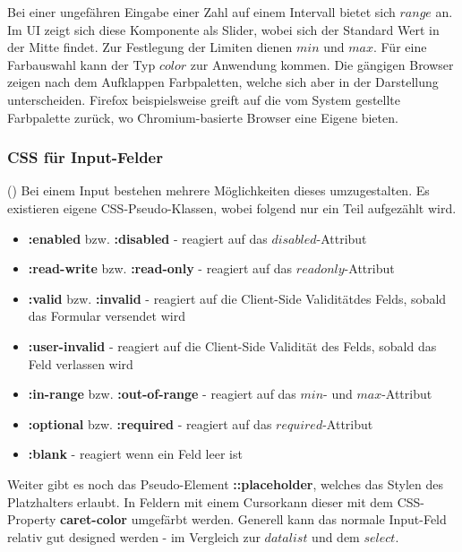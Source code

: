 Bei einer ungefähren Eingabe einer Zahl auf einem Intervall bietet sich $range$ an.
Im UI zeigt sich diese Komponente als Slider, wobei sich der Standard Wert in der Mitte findet.
Zur Festlegung der Limiten dienen $min$ und $max$.
Für eine Farbauswahl kann der Typ $color$ zur Anwendung kommen. 
Die gängigen Browser zeigen nach dem Aufklappen Farbpaletten, welche sich aber in der Darstellung unterscheiden. 
Firefox beispielsweise greift auf die vom System gestellte Farbpalette zurück, wo Chromium-basierte Browser eine Eigene bieten.

\subsubsection{{\color{dgray} CSS für Input-Felder}}
(\cite{inputMdn}) Bei einem Input bestehen mehrere Möglichkeiten dieses umzugestalten.
Es existieren eigene CSS-Pseudo-Klassen, wobei folgend nur ein Teil aufgezählt wird.

\begin{itemize} %
    \item \textbf{:enabled} bzw. \textbf{:disabled} - reagiert auf das $disabled$-Attribut
    \item \textbf{:read-write} bzw. \textbf{:read-only} - reagiert auf das $readonly$-Attribut
    \item \textbf{:valid} bzw. \textbf{:invalid} - reagiert auf die Client-Side Validität\footnotemark des Felds, sobald das Formular versendet wird
    \item \textbf{:user-invalid} - reagiert auf die Client-Side Validität des Felds, sobald das Feld verlassen wird
    \item \textbf{:in-range} bzw. \textbf{:out-of-range} - reagiert auf das $min$- und $max$-Attribut
    \item \textbf{:optional} bzw. \textbf{:required} - reagiert auf das $required$-Attribut
    \item \textbf{:blank} - reagiert wenn ein Feld leer ist
\end{itemize}

Weiter gibt es noch das Pseudo-Element \textbf{::placeholder}, welches das Stylen des Platzhalters erlaubt.
In Feldern mit einem Cursor\footnotemark kann dieser mit dem CSS-Property \textbf{caret-color} umgefärbt werden.
Generell kann das normale Input-Feld relativ gut designed werden - im Vergleich zur $datalist$ und dem $select$.


